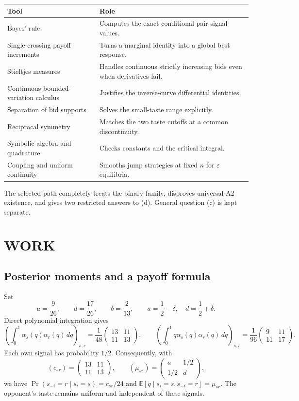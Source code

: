 \documentclass[11pt,a4paper]{article}
\theoremstyle{remark}\newtheorem{remark}[theorem]{Remark}
\newcommand{\E}{\mathbb E}
\begin{document}
\begin{center}\begin{tabular}{p{.25\linewidth}p{.66\linewidth}}\toprule
Tool & Role \\\midrule
Bayes' rule & Computes the exact conditional pair-signal values.\\
Single-crossing payoff increments & Turns a marginal identity into a global best response.\\
Stieltjes measures & Handles continuous strictly increasing bids even when derivatives fail.\\
Continuous bounded-variation calculus & Justifies the inverse-curve differential identities.\\
Separation of bid supports & Solves the small-taste range explicitly.\\
Reciprocal symmetry & Matches the two taste cutoffs at a common discontinuity.\\
Symbolic algebra and quadrature & Checks constants and the critical integral.\\
Coupling and uniform continuity & Smooths jump strategies at fixed $n$ for $\varepsilon$ equilibria.\\\bottomrule
\end{tabular}\end{center}
The selected path completely treats the binary family, disproves universal A2 existence, and gives two restricted answers to (d). General question (c) is kept separate.

\section{WORK}
\subsection{Posterior moments and a payoff formula}
Set
\[
 a=\frac9{26},\qquad d=\frac{17}{26},\qquad \delta=\frac2{13},
 \qquad a=\frac12-\delta,\quad d=\frac12+\delta.
\]
Direct polynomial integration gives
\[
 \left(\int_0^1\alpha_s(q)\alpha_r(q)\,dq\right)_{s,r}
 =\frac1{48}\begin{pmatrix}13&11\\11&13\end{pmatrix},\qquad
 \left(\int_0^1q\alpha_s(q)\alpha_r(q)\,dq\right)_{s,r}
 =\frac1{96}\begin{pmatrix}9&11\\11&17\end{pmatrix}.
\]
Each own signal has probability $1/2$. Consequently, with
\[
 (c_{sr})=\begin{pmatrix}13&11\\11&13\end{pmatrix},\qquad
 (\mu_{sr})=\begin{pmatrix}a&1/2\\1/2&d\end{pmatrix},
\]
we have $\Pr(s_{-i}=r\mid s_i=s)=c_{sr}/24$ and
$\E[q\mid s_i=s,s_{-i}=r]=\mu_{sr}$. The opponent's taste remains uniform and independent of these signals.
\end{document}
